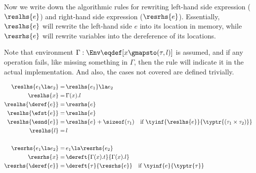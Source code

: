Now we write down the algorithmic rules  for rewriting left-hand side expression ($\reslhs{e}$)
and right-hand side expression ($\resrhs{e}$). Essentially, $\reslhs{e}$ will rewrite the left-hand side $e$ into its location
in memory, while $\resrhs{e}$ will rewrite variables into the dereference of its locations.

Note that environment $\Gamma : \Env \eqdef [x \gmapsto (\tau, l)]$ is assumed, and if any operation fails, like missing something in $\Gamma$,
then the rule will indicate it in the actual implementation.
And also, the cases not covered are defined trivially.

\begin{align*}\label{envrules}
\reslhs{e_1 \la e_2} =&\, \reslhs{e_1} \la e_2\\
\reslhs{x} =&\, \Gamma(x).l \\
\reslhs{\deref{e}} =&\, \resrhs{e} \\
\reslhs{\efst{e}} =&\, \reslhs{e} \\
\reslhs{\esnd{e}} =&\, \reslhs{e} + \sizeof(\tau_1) \quad \text{if } \tyinf{\reslhs{e}}{\typtr{(\tau_1 \times \tau_2)}}\\
\reslhs{l} =&\, l\\
\\
\resrhs{e_1 \la e_2} =&\, e_1 \la \resrhs{e_2}\\
\resrhs{x} =&\, \dereft{\Gamma(x).t}{\Gamma(x).l} \\
\resrhs{\deref{e}} =&\, \dereft{\tau}{\resrhs{e}} \quad \text{if } \tyinf{e}{\typtr{\tau}}
\end{align*}

